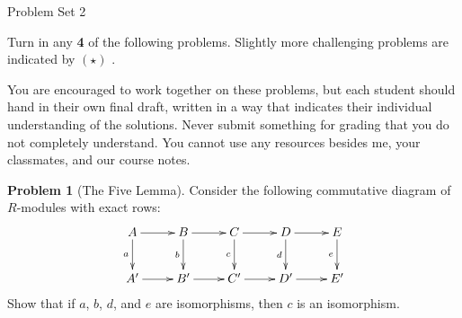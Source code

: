 \documentclass[11pt]{article}
\title{}
\date{\vspace{-0.5in}}
\theoremstyle{definition}
\newtheorem{problem}{Problem}
\begin{document}
\thispagestyle{fancy}
\pagestyle{fancy}

\vspace{3em}

\begin{center}
	{\LARGE Problem Set 2}
\end{center}


\vspace{2em}


\noindent
Turn in any {\bf 4} of the following problems. 
Slightly more challenging problems are indicated by $(\star)$ .

%
\noindent
You are encouraged to work together on these problems, but each student should hand in their own final draft, written in a way that indicates their individual understanding of the solutions. Never submit something for grading that you do not completely understand. You cannot use any resources besides me, your classmates, and our course notes.
%
%


\vspace{2em}

\begin{problem}[The Five Lemma]
Consider the following commutative diagram of $R$-modules with exact rows:
$$\xymatrix{A \ar[d]_-a \ar[r] & B \ar[r] \ar[d]_-b & C \ar[r] \ar[d]_-c & D \ar[d]_-d \ar[r] & E \ar[d]_-e \\
	A' \ar[r] & B' \ar[r] & C' \ar[r] & D' \ar[r] & E'}$$
Show that if $a$, $b$, $d$, and $e$ are isomorphisms, then $c$ is an isomorphism.
\end{problem}


\vfill
\end{document}
